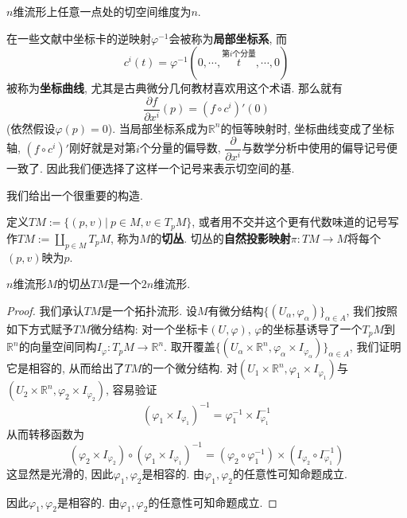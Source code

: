 \begin{col}
    $n$维流形上任意一点处的切空间维度为$n$.
\end{col}

\begin{rem}
    在一些文献中坐标卡的逆映射$\varphi^{-1}$会被称为\textbf{局部坐标系}, 而
    \[c^i(t)=\varphi^{-1}(0,\cdots,\stackrel{{\text{第}i\text{个分量}}}{t},\cdots,0)\]
    被称为\textbf{坐标曲线}, 尤其是古典微分几何教材喜欢用这个术语.
    那么就有
    \[\dfrac{\partial f}{\partial x^i}(p)=(f\circ c^i)'(0)\]
    (依然假设$\varphi(p)=0$).
    当局部坐标系成为$\mathbb{R}^n$的恒等映射时, 坐标曲线变成了坐标轴, $(f\circ c^i)'$刚好就是对第$i$个分量的偏导数, $\dfrac{\partial}{\partial x^i}$与数学分析中使用的偏导记号便一致了.
    因此我们便选择了这样一个记号来表示切空间的基.
\end{rem}

我们给出一个很重要的构造.

\begin{defn}
    定义$TM:=\{(p,v)|\ p\in M,v\in T_pM\}$, 或者用不交并这个更有代数味道的记号写作$\displaystyle TM:=\coprod_{p\in M}T_pM$, 称为$M$的\textbf{切丛}.
    切丛的\textbf{自然投影映射}$\pi:TM\to M$将每个$(p,v)$映为$p$.
\end{defn}

\begin{prop}\label{diff_stru_TM}
    $n$维流形$M$的切丛$TM$是一个$2n$维流形.
\end{prop}
\begin{proof}
    我们承认$TM$是一个拓扑流形.
    设$M$有微分结构$\{(U_\alpha,\varphi_\alpha)\}_{\alpha\in A}$, 我们按照如下方式赋予$TM$微分结构:
    对一个坐标卡$(U,\varphi)$, $\varphi$的坐标基诱导了一个$T_pM$到$\mathbb{R}^n$的向量空间同构$I_\varphi:T_pM\to\mathbb{R}^n$.
    取开覆盖$\{(U_\alpha\times\mathbb{R}^n,\varphi_\alpha\times I_{\varphi_\alpha})\}_{\alpha\in A}$, 我们证明它是相容的, 从而给出了$TM$的一个微分结构.
    对$(U_1\times\mathbb{R}^n,\varphi_1\times I_{\varphi_1})$与$(U_2\times\mathbb{R}^n,\varphi_2\times I_{\varphi_2})$, 容易验证
    \[(\varphi_1\times I_{\varphi_1})^{-1}=\varphi_1^{-1}\times I_{\varphi_1}^{-1}\]
    从而转移函数为
    \[(\varphi_2\times I_{\varphi_2})\circ(\varphi_1\times I_{\varphi_1})^{-1}=(\varphi_2\circ\varphi_1^{-1})\times(I_{\varphi_2}\circ I_{\varphi_1}^{-1})\]
    这显然是光滑的, 因此$\varphi_1,\varphi_2$是相容的.
    由$\varphi_1,\varphi_2$的任意性可知命题成立.
    
    因此$\varphi_1,\varphi_2$是相容的.
    由$\varphi_1,\varphi_2$的任意性可知命题成立.
\end{proof}

